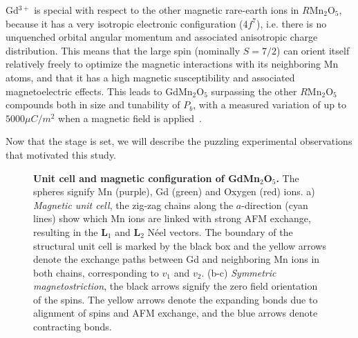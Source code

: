 Gd$^{3+}$ is special with respect to the other magnetic rare-earth ions in $R$Mn$_2$O$_5$, because it has a very isotropic electronic configuration (4$f^7$), i.e. there is no unquenched orbital angular momentum and associated anisotropic charge distribution. This means that the large spin (nominally $S=7/2$) can orient itself relatively freely to optimize the magnetic interactions with its neighboring Mn atoms, and that it has a high magnetic susceptibility and associated magnetoelectric effects.
This leads to GdMn$_2$O$_5$ surpassing the other $R$Mn$_2$O$_5$ compounds both in size and tunability of $P_b$, with a measured variation of up to $5000 \mu C/m^2$ when a magnetic field is applied~\cite{Lee13}. 

Now that the stage is set, we will describe the puzzling experimental observations that motivated this study.

\begin{figure}
	\caption{\label{fig:GdMn2O5_unit_cell}{\bf Unit cell and magnetic configuration of GdMn$_2$O$_5$.} The spheres signify Mn (purple), Gd (green) and Oxygen (red) ions. a) {\it Magnetic unit cell}, the zig-zag chains along the $a$-direction (cyan lines) show which Mn ions are linked with strong AFM exchange, resulting in the $\mathbf{L}_1$ and $\mathbf{L}_2$ N\'eel vectors. The boundary of the structural unit cell is marked by the black box and the yellow arrows denote the exchange paths between Gd and neighboring Mn ions in both chains, corresponding to $v_1$ and $v_2$. (b-c) {\it Symmetric magnetostriction}, the black arrows signify the zero field orientation of the spins. The yellow arrows denote the expanding bonds due to alignment of spins and AFM exchange, and the blue arrows denote contracting bonds.}
\end{figure}
